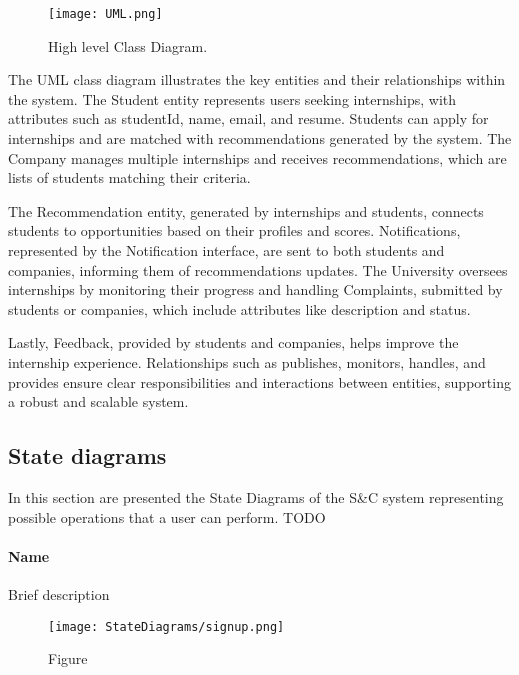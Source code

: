 \begin{figure}[H]
    \begin{center}
        \texttt{[image: UML.png]}
        \caption{High level Class Diagram.}
        \label{fig:UML}%
    \end{center}
\end{figure}

The UML class diagram illustrates the key entities and their relationships within the system. The Student entity represents users seeking internships, with attributes such as studentId, name, email, and resume. Students can apply for internships and are matched with recommendations generated by the system. The Company manages multiple internships and receives recommendations, which are lists of students matching their criteria.

The Recommendation entity, generated by internships and students, connects students to opportunities based on their profiles and scores. Notifications, represented by the Notification interface, are sent to both students and companies, informing them of recommendations updates. The University oversees internships by monitoring their progress and handling Complaints, submitted by students or companies, which include attributes like description and status.

Lastly, Feedback, provided by students and companies, helps improve the internship experience. Relationships such as publishes, monitors, handles, and provides ensure clear responsibilities and interactions between entities, supporting a robust and scalable system.\\


\subsection{State diagrams}
\label{subsec:state_diagrams}%
In this section are presented the State Diagrams of the S\&C system representing possible operations that a user can perform.
TODO

\paragraph{Name}
Brief description

\begin{figure}[H]
    \begin{center}
        \texttt{[image: StateDiagrams/signup.png]}
        \caption{Figure}
        \label{fig:signup_sd}%
    \end{center}
\end{figure}


